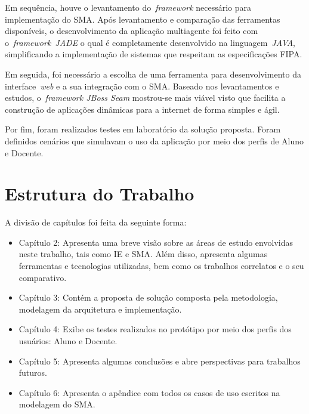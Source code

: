 Em sequência, houve o levantamento do~\emph{framework} necessário para implementação do SMA. Após levantamento e comparação das ferramentas disponíveis, o desenvolvimento da aplicação multiagente foi feito com o~\emph{framework}~\emph{JADE} o qual é completamente desenvolvido na linguagem~\emph{JAVA}, simplificando a implementação de sistemas que respeitam as especificações FIPA. 

Em seguida, foi necessário a escolha de uma ferramenta para desenvolvimento da interface~\emph{web} e a sua integração com o SMA. Baseado nos levantamentos e estudos, o~\emph{framework JBoss Seam} mostrou-se mais viável visto que facilita a construção de aplicações dinâmicas para a internet de forma simples e ágil.

Por fim, foram realizados testes em laboratório da solução proposta. Foram definidos cenários que simulavam o uso da aplicação por meio dos perfis de Aluno e Docente.

\section{Estrutura do Trabalho}
A divisão de capítulos foi feita da seguinte forma:
\begin{itemize}
	\item Capítulo 2: Apresenta uma breve visão sobre as áreas de estudo envolvidas neste trabalho, tais como IE e SMA. Além disso, apresenta algumas ferramentas e tecnologias utilizadas, bem como os trabalhos correlatos e o seu comparativo.
	\item Capítulo 3: Contém a proposta de solução composta pela metodologia, modelagem da arquitetura e implementação.
	\item Capítulo 4: Exibe os testes realizados no protótipo por meio dos perfis dos usuários: Aluno e Docente.
	\item Capítulo 5: Apresenta algumas conclusões e abre perspectivas para trabalhos futuros.
	\item Capítulo 6: Apresenta o apêndice com todos os casos de uso escritos na modelagem do SMA.
\end{itemize}
